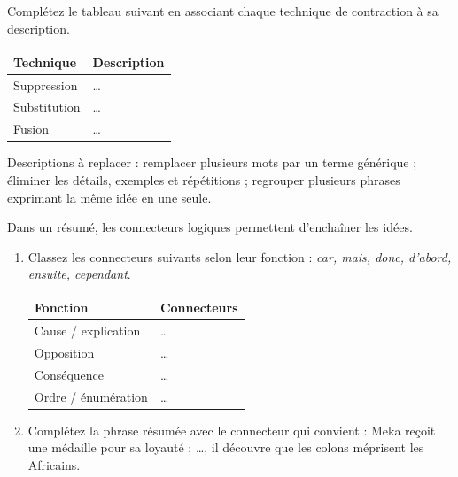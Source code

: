 \documentclass[11pt]{article}
\begin{document}
\begin{exercice}
Complétez le tableau suivant en associant chaque technique de contraction à sa description.
\begin{center}
\begin{tabular}{|l|l|}
\hline
\textbf{Technique} & \textbf{Description} \\
\hline
Suppression & \ldots \\
\hline
Substitution & \ldots \\
\hline
Fusion & \ldots \\
\hline
\end{tabular}
\end{center}
Descriptions à replacer : remplacer plusieurs mots par un terme générique ; éliminer les détails, exemples et répétitions ; regrouper plusieurs phrases exprimant la même idée en une seule.
\end{exercice}

\begin{exercice}
Dans un résumé, les connecteurs logiques permettent d'enchaîner les idées.
\begin{enumerate}
\item Classez les connecteurs suivants selon leur fonction : \emph{car, mais, donc, d'abord, ensuite, cependant}.
\begin{center}
\begin{tabular}{|l|l|}
\hline
\textbf{Fonction} & \textbf{Connecteurs} \\
\hline
Cause / explication & \ldots \\
\hline
Opposition & \ldots \\
\hline
Conséquence & \ldots \\
\hline
Ordre / énumération & \ldots \\
\hline
\end{tabular}
\end{center}
\item Complétez la phrase résumée avec le connecteur qui convient : \og Meka reçoit une médaille pour sa loyauté ; \ldots, il découvre que les colons méprisent les Africains. \fg
\end{enumerate}
\end{exercice}
\end{document}
